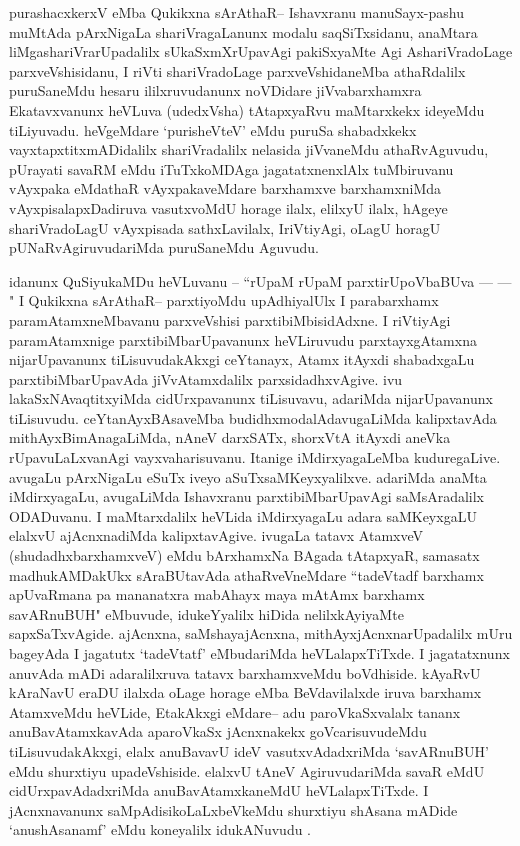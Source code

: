 \begin{artha}
purashacxkerxV eMba Qukikxna sArAthaR-- Ishavxranu manuSayx-pashu muMtAda pArxNigaLa shariVragaLanunx modalu saqSiTxsidanu, anaMtara liMgashariVrarUpadalilx sUkaSxmXrUpavAgi pakiSxyaMte Agi AshariVradoLage parxveVshisidanu, I riVti shariVradoLage parxveVshidaneMba athaRdalilx puruSaneMdu hesaru ililxruvudanunx noVDidare jiVvabarxhamxra Ekatavxvanunx heVLuva (udedxVsha) tAtapxyaRvu maMtarxkekx ideyeMdu tiLiyuvadu. heVgeMdare `purisheVteV' eMdu puruSa shabadxkekx vayxtapxtitxmADidalilx shariVradalilx nelasida jiVvaneMdu athaRvAguvudu, pUrayati savaRM eMdu iTuTxkoMDAga jagatatxnenxlAlx tuMbiruvanu vAyxpaka eMdathaR vAyxpakaveMdare barxhamxve barxhamxniMda vAyxpisalapxDadiruva vasutxvoMdU horage ilalx, elilxyU ilalx, hAgeye shariVradoLagU vAyxpisada sathxLavilalx, IriVtiyAgi, oLagU horagU pUNaRvAgiruvudariMda puruSaneMdu Aguvudu.  

idanunx  QuSiyukaMDu heVLuvanu {\rm --} ``rUpaM rUpaM parxtirUpoV\-baBUva  {\rm ---}  {\rm ---}  " I Qukikxna sArAthaR-- parxtiyoMdu upAdhiyalUlx I parabarxhamx paramAtamxneMbavanu parxveVshisi parxtibiMbisidAdxne. I riVtiyAgi paramAtamxnige \-parxtibiMbarUpavanunx heVLiruvudu parxtayxgAtamxna nijarUpavanunx tiLisuvudakAkxgi \break ceYtanayx, Atamx itAyxdi shabadxgaLu parxtibiMbarUpavAda jiVvAtamxdalilx parxsidadhxvAgive. ivu lakaSxNAvaqtitxyiMda cidUrxpavanunx tiLisuvavu, adariMda nijarUpavanunx \break tiLisuvudu. ceYtanAyxBAsaveMba budidhxmodalAdavugaLiMda kalipxtavAda mithAyx\-BimAnagaLiMda, nAneV darxSATx, shorxVtA itAyxdi aneVka rUpavuLaLxvanAgi vayxvaharisuvanu. Itanige iMdirxyagaLeMba kuduregaLive. avugaLu pArxNigaLu eSuTx iveyo aSuTxsaMKeyxyalilxve. adariMda anaMta iMdirxyagaLu, avugaLiMda Ishavxranu parxtibiMbarUpavAgi saMsAradalilx ODADuvanu. I maMtarxdalilx heVLida iMdirxyagaLu adara saMKeyxgaLU elalxvU ajAcnxnadiMda kalipxtavAgive. ivugaLa tatavx AtamxveV (shudadhxbarxhamxveV) eMdu bArxhamxNa BAgada tAtapxyaR, samasatx madhukAMDakUkx sAraBUtavAda athaRveVneMdare ``tadeVtadf barxhamx apUvaRmana pa mananatxra mabAhayx maya mAtAmx barxhamx savARnuBUH" eMbuvude, idukeYyalilx hiDida nelilxkAyiyaMte sapxSaTxvAgide. ajAcnxna, saMshayajAcnxna, mithAyxjAcnxnarUpadalilx mUru bageyAda I jagatutx `tadeVtatf' eMbudariMda heVLalapxTiTxde. I jagatatxnunx anuvAda mADi adaralilxruva tatavx barxhamxveMdu boVdhiside. kAyaRvU kAraNavU eraDU ilalxda oLage horage eMba BeVdavilalxde iruva barxhamx AtamxveMdu heVLide, EtakAkxgi eMdare-- adu paroVkaSxvalalx tananx anuBavAtamxkavAda aparoVkaSx jAcnxnakekx goVcarisuvudeMdu tiLisuvudakAkxgi, elalx anuBavavU ideV vasutxvAdadxriMda `savARnuBUH' eMdu shurxtiyu upadeVshiside. elalxvU tAneV AgiruvudariMda savaR eMdU cidUrxpavAdadxriMda anuBavAtamxkaneMdU heVLalapxTiTxde. I jAcnxnavanunx saMpAdisikoLaLxbeVkeMdu shurxtiyu shAsana mADide `anushAsanamf' eMdu koneyalilx idukANuvudu .
\end{artha}

